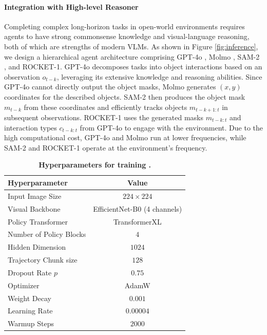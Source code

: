 \paragraph{Integration with High-level Reasoner} 
Completing complex long-horizon tasks in open-world environments requires agents to have strong commonsense knowledge and visual-language reasoning, both of which are strengths of modern VLMs. As shown in Figure \ref{fig:inference}, we design a hierarchical agent architecture comprising GPT-4o \citep{gpt4}, Molmo \citep{molmo}, SAM-2 \citep{sam2}, and ROCKET-1. GPT-4o decomposes tasks into object interactions based on an observation $o_{t-k}$, leveraging its extensive knowledge and reasoning abilities. Since GPT-4o cannot directly output the object masks, Molmo generates $(x, y)$ coordinates for the described objects. SAM-2 then produces the object mask $m_{t-k}$ from these coordinates and efficiently tracks objects $m_{t-k+1:t}$ in subsequent observations. ROCKET-1 uses the generated masks $m_{t-k:t}$ and interaction types $c_{t-k:t}$ from GPT-4o to engage with the environment. Due to the high computational cost, GPT-4o and Molmo run at lower frequencies, while SAM-2 and ROCKET-1 operate at the environment’s frequency. 

\begin{table}[t]
\footnotesize
\centering
\setlength{\tabcolsep}{3.5 mm}
\caption{
\textbf{Hyperparameters for training \agent.} 
} \label{table:implementation}
\begin{tabular}{@{}lc@{}}
\toprule
\textbf{Hyperparameter}  & \textbf{Value}   \\ \midrule
Input Image Size         & $224 \times 224$ \\
Visual Backbone          & EfficientNet-B0 (4 channels)  \\
Policy Transformer       & TransformerXL \\
Number of Policy Blocks  & $4$         \\
Hidden Dimension         & $1024$      \\
Trajectory Chunk size    & $128$       \\
Dropout Rate $p$         & $0.75$      \\
Optimizer                & AdamW       \\
Weight Decay             & $0.001$     \\
Learning Rate            & $0.00004$   \\
Warmup Steps             & $2000$      \\
\bottomrule
\end{tabular}
\end{table}


